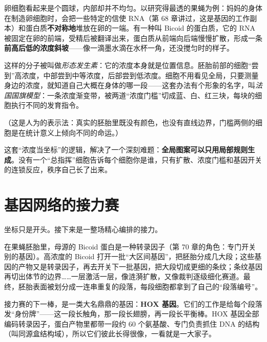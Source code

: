 卵细胞看起来是个圆球，内部却并不均匀。以研究得最透的果蝇为例：妈妈的身体在制造卵细胞时，会把一些特定的信使 RNA（第 68 章讲过，这是基因的工作副本）和蛋白质\textbf{不对称地}堆放在卵的一端。有一种叫 Bicoid 的蛋白质，它的 RNA 被固定在卵的前端，受精后被翻译出来，蛋白质从前端向后端慢慢扩散，形成一条\textbf{前高后低的浓度斜坡}——像一滴墨水滴在水杯一角，还没搅匀时的样子。

这样的分子被叫做\emph{形态发生素}：它的浓度本身就是位置信息。胚胎前部的细胞“尝到”高浓度，中部尝到中等浓度，后部尝到低浓度。细胞不用看见全局，只要测量身边的浓度，就知道自己大概在身体的哪一段——这套办法有个形象的名字，叫\emph{法国国旗模型}：一条浓度渐变带，被两道“浓度门槛”切成蓝、白、红三块，每块的细胞执行不同的发育指令。

\begin{center}
\end{center}

（这是人为的表示法：真实的胚胎里既没有颜色，也没有直线边界，门槛两侧的细胞是在统计意义上倾向不同的命运。）

这套“浓度当坐标”的逻辑，解决了一个深刻难题：\textbf{全局图案可以只用局部规则生成}。没有一个“总指挥”细胞告诉每个细胞你是谁，只有扩散、浓度门槛和基因开关的连锁反应，秩序自己长了出来。

\section{基因网络的接力赛}

坐标只是开头。接下来是一整场精心编排的接力。

在果蝇胚胎里，母源的 Bicoid 蛋白是一种转录因子（第 70 章的角色：专门开关别的基因）。高浓度的 Bicoid 打开一批“大区间基因”，把胚胎分成几大段；这些基因的产物又是转录因子，再去开关下一批基因，把大段切成更细的条纹；条纹基因再切出体节的边界……一层激活一层，像涟漪扩散，又像裁判逐级细化赛道。最终，胚胎表面被划分成一连串重复的段落，每段细胞都拿到了自己的“段落编号”。

接力赛的下一棒，是一类大名鼎鼎的基因：\textbf{HOX 基因}。它们的工作是给每个段落发“身份牌”——这一段长触角，那一段长翅膀，再一段长平衡棒。HOX 基因全部编码转录因子，蛋白产物里都带一段约 60 个氨基酸、专门负责抓住 DNA 的结构（叫同源盒结构域），所以它们彼此长得很像，一看就是一大家子。

